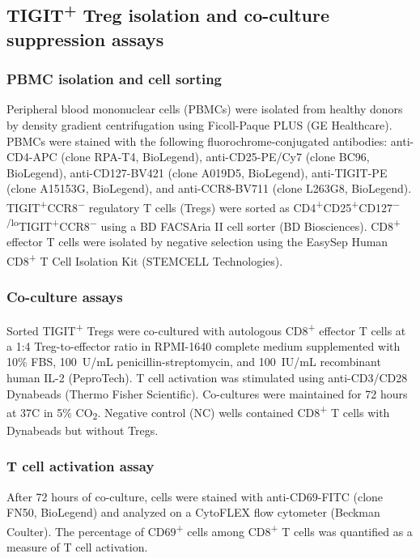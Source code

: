 
\subsection*{TIGIT\textsuperscript{+} Treg isolation and co-culture suppression assays}

\subsubsection*{PBMC isolation and cell sorting}
Peripheral blood mononuclear cells (PBMCs) were isolated from healthy donors by density gradient centrifugation using Ficoll-Paque PLUS (GE Healthcare). PBMCs were stained with the following fluorochrome-conjugated antibodies: anti-CD4-APC (clone RPA-T4, BioLegend), anti-CD25-PE/Cy7 (clone BC96, BioLegend), anti-CD127-BV421 (clone A019D5, BioLegend), anti-TIGIT-PE (clone A15153G, BioLegend), and anti-CCR8-BV711 (clone L263G8, BioLegend). TIGIT\textsuperscript{+}CCR8\textsuperscript{$-$} regulatory T cells (Tregs) were sorted as CD4\textsuperscript{+}CD25\textsuperscript{+}CD127\textsuperscript{$-$/lo}TIGIT\textsuperscript{+}CCR8\textsuperscript{$-$} using a BD FACSAria II cell sorter (BD Biosciences). CD8\textsuperscript{+} effector T cells were isolated by negative selection using the EasySep Human CD8\textsuperscript{+} T Cell Isolation Kit (STEMCELL Technologies).

\subsubsection*{Co-culture assays}
Sorted TIGIT\textsuperscript{+} Tregs were co-cultured with autologous CD8\textsuperscript{+} effector T cells at a 1:4 Treg-to-effector ratio in RPMI-1640 complete medium supplemented with 10\% FBS, 100~U/mL penicillin-streptomycin, and 100~IU/mL recombinant human IL-2 (PeproTech). T cell activation was stimulated using anti-CD3/CD28 Dynabeads (Thermo Fisher Scientific). Co-cultures were maintained for 72 hours at 37\textdegree C in 5\% CO\textsubscript{2}. Negative control (NC) wells contained CD8\textsuperscript{+} T cells with Dynabeads but without Tregs.

\subsubsection*{T cell activation assay}
After 72 hours of co-culture, cells were stained with anti-CD69-FITC (clone FN50, BioLegend) and analyzed on a CytoFLEX flow cytometer (Beckman Coulter). The percentage of CD69\textsuperscript{+} cells among CD8\textsuperscript{+} T cells was quantified as a measure of T cell activation.

